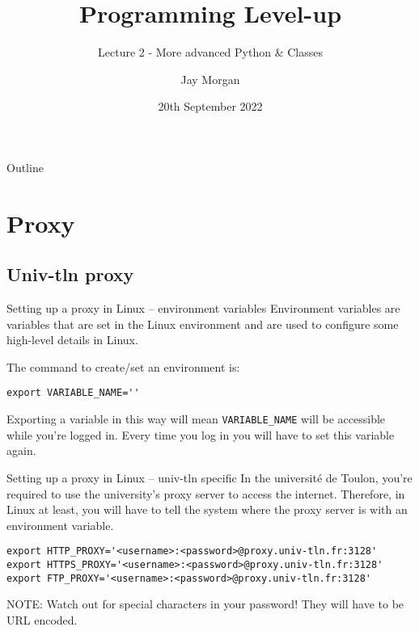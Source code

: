 \documentclass[10pt]{beamer}
\author{Jay Morgan}
\date{20th September 2022}
\title{Programming Level-up}
\subtitle{Lecture 2 - More advanced Python \& Classes}
\begin{document}
\maketitle
\begin{frame}{Outline}
\tableofcontents
\end{frame}


\section{Proxy}
\label{sec:org33a8a17}

\subsection{Univ-tln proxy}
\label{sec:org3d35a60}

\begin{frame}[label={sec:org0fa466f},fragile]{Setting up a proxy in Linux -- environment variables}
 Environment variables are variables that are set in the Linux environment and are
used to configure some high-level details in Linux.

The command to create/set an environment is:

\begin{verbatim}
export VARIABLE_NAME=''
\end{verbatim}

Exporting a variable in this way will mean \texttt{VARIABLE\_NAME} will be accessible while
you're logged in. Every time you log in you will have to set this variable again.
\end{frame}

\begin{frame}[label={sec:org6d94dbe},fragile]{Setting up a proxy in Linux -- univ-tln specific}
 In the université de Toulon, you're required to use the university's proxy server to
access the internet. Therefore, in Linux at least, you will have to tell the system
where the proxy server is with an environment variable.

\begin{verbatim}
export HTTP_PROXY='<username>:<password>@proxy.univ-tln.fr:3128'
export HTTPS_PROXY='<username>:<password>@proxy.univ-tln.fr:3128'
export FTP_PROXY='<username>:<password>@proxy.univ-tln.fr:3128'
\end{verbatim}

\alert{NOTE}: Watch out for special characters in your password! They will have to be URL encoded.
\end{frame}
\end{document}
